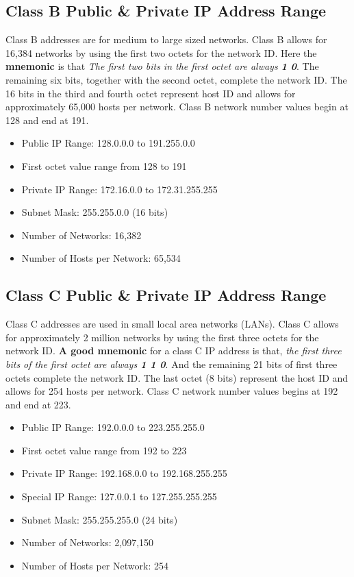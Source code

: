 \documentclass[a4paper,12pt]{book}
\begin{document}
\subsection{Class B Public & Private IP Address Range}
Class B addresses are for medium to large sized networks. Class B allows for 16,384 networks by using the first two octets for the network ID. Here the \textbf{mnemonic} is that \emph{The first two bits in the first octet are always \textbf{1 0}}. The remaining six bits, together with the second octet, complete the network ID. The 16 bits in the third and fourth octet represent host ID and allows for approximately 65,000 hosts per network. Class B network number values begin at 128 and end at 191.

\begin{itemize}
\item{Public IP Range: 128.0.0.0 to 191.255.0.0}
\item{First octet value range from 128 to 191}
\item{Private IP Range: 172.16.0.0 to 172.31.255.255}
\item{Subnet Mask: 255.255.0.0 (16 bits)}
\item{Number of Networks: 16,382}
\item{Number of Hosts per Network: 65,534}
\end{itemize}

\subsection{Class C Public & Private IP Address Range}
Class C addresses are used in small local area networks (LANs). Class C allows for approximately 2 million networks by using the first three octets for the network ID. \textbf{A good mnemonic} for a class C IP address is that, \emph{the first three bits of the first octet are always \textbf{1 1 0}}. And the remaining 21 bits of first three octets complete the network ID. The last octet (8 bits) represent the host ID and allows for 254 hosts per network. Class C network number values begins at 192 and end at 223.

\begin{itemize}
\item{Public IP Range: 192.0.0.0 to 223.255.255.0}
\item{First octet value range from 192 to 223}
\item{Private IP Range: 192.168.0.0 to 192.168.255.255}
\item{Special IP Range: 127.0.0.1 to 127.255.255.255}
\item{Subnet Mask: 255.255.255.0 (24 bits)}
\item{Number of Networks: 2,097,150}
\item{Number of Hosts per Network: 254}
\end{itemize}
\clearpage
\end{document}
